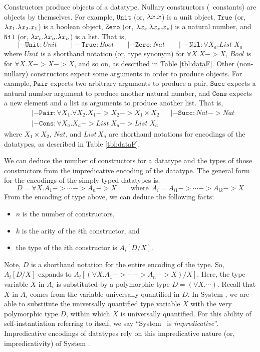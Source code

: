 Constructors produce objects of a datatype. Nullary constructors
(\aka\ constants) are objects by themselves. For example,
$\mathtt{Unit}$ (or, $\lambda x.x$) is a unit object,
$\mathtt{True}$ (or, $\lambda x_1.\lambda x_2. x_1$) is a boolean object,
$\mathtt{Zero}$ (or, $\lambda x_s. \lambda x_z. x_z$) is a natural number, and
$\mathtt{Nil}$ (or, $\lambda x_c.\lambda x_n.\lambda x_n$) is a list.
That is,
\[
|- \mathtt{Unit}:\textit{Unit} \qquad
|- \mathtt{True}:\textit{Bool} \qquad
|- \mathtt{Zero}:\textit{Nat} \qquad
|- \mathtt{Nil}:\forall X_a.\textit{List}\;X_a
\]
where $\textit{Unit}$ is a shorthand notation (or, type synonym)
for $\forall X.X -> X$, $Bool$ is for $\forall X.X -> X -> X$, and so on,
as described in Table \ref{tbl:dataF}.
Other (non-nullary) constructors expect some arguments in order to produce
objects. For example, $\mathtt{Pair}$ expects two arbitrary arguments
to produce a pair, $\mathtt{Succ}$ expects a natural number argument
to produce another natural number, and $\mathtt{Cons}$ expects
a new element and a list as arguments to produce another list. That is,
\begin{align*}
& |- \mathtt{Pair} : \forall X_1. \forall X_2. X_1 -> X_2 -> X_1\times X_2
&& |- \mathtt{Succ} : \textit{Nat} -> \textit{Nat} \\ &
|- \mathtt{Cons} : \forall X_a. X_a -> \mathit{List}\;X_a -> \mathit{List}\;X_a
\end{align*}
where ${X_1 \times X_2}$, $\mathit{Nat}$, and $\mathit{List\,X_a}$
are shorthand notations for encodings of the datatypes,
as described in Table \ref{tbl:dataF}.

We can deduce the number of constructors for a datatype and the types
of those constructors from the impredicative encoding of the datatype.
The general form for the encodings of the simply-typed datatypes is:
\[D = \forall X. A_1 -> \cdots -> A_n -> X
        \qquad\text{where}~~ A_i = A_{i1} -> \cdots -> A_{ik} -> X \]
From the encoding of type above, we can deduce the following facts:
\begin{itemize}
\item $n$ is the number of constructors,
\item $k$ is the arity of the $i$th constructor, and
\item the type of the $i$th constructor is $A_i[D/X]$.
\end{itemize}
Note, $D$ is a shorthand notation for the entire encoding of the type.
So, $A_i[D/X]$ expands to $A_i[(\forall X. A_1 -> \cdots -> A_n -> X)/ X]$.
Here, the type variable $X$ in $A_i$ is substituted by a polymorphic type
$D = (\forall X. \cdots)$. Recall that $X$ in $A_i$ comes from
the variable universally quantified in $D$. In System \F, we are able to
substitute the universally quantified type variable $X$ with
the very polymorphic type $D$, within which $X$ is universally quantified.
For this ability of self-instantiation referring to itself, we say
``System \F\ is \emph{impredicative}''. Impredicative encodings
of datatypes rely on this impredicative nature (or, impredicativity)
of System \F.

